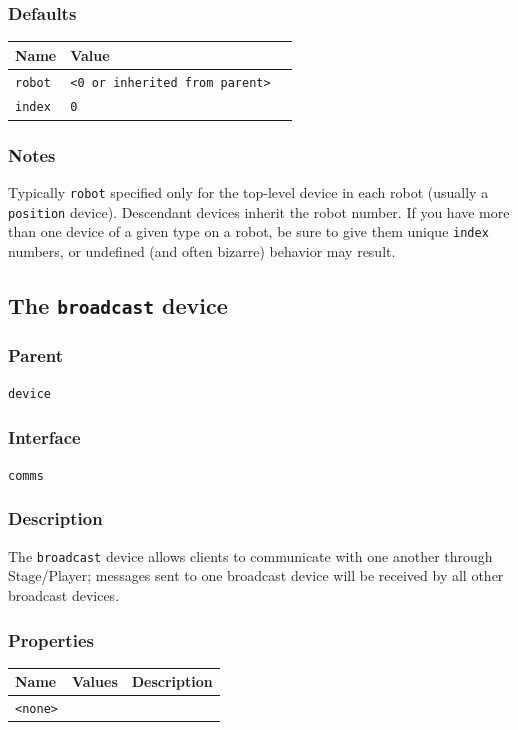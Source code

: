 \documentclass[11pt,twoside]{report}
\begin{document}
\subsubsection*{Defaults}
\begin{tabularx}{\columnwidth}{llX}
\hline
Name & Value\\
\hline
\verb'robot' & \verb'<0 or inherited from parent>'\\
\verb'index' & \verb'0'\\
\hline
\end{tabularx}

\subsubsection{Notes}
Typically \verb'robot' specified only for the top-level device in each
robot (usually a \verb'position' device). Descendant devices inherit
the robot number. If you have more than one device of a given type on
a robot, be sure to give them unique \verb'index' numbers, or
undefined (and often bizarre) behavior may result.

\newpage
\subsection{The {\tt broadcast} device}

\subsubsection*{Parent}
{\tt device}

\subsubsection*{Interface}
{\tt comms}

\subsubsection*{Description}
The {\tt broadcast} device allows clients to communicate with one
another through Stage/Player; messages sent to one broadcast device
will be received by all other broadcast devices. 

\subsubsection*{Properties}
\begin{tabularx}{\columnwidth}{llX}
\hline
Name & Values & Description \\
\hline
\verb'<none>'\\
\hline
\end{tabularx}
\end{document}
